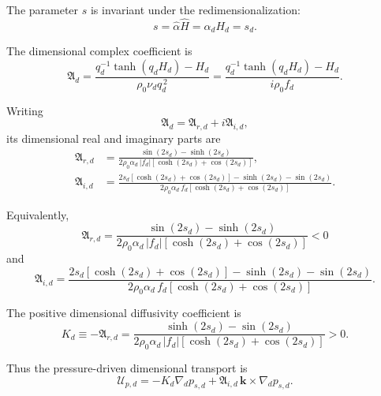 \documentclass[10pt]{amsart}
\begin{document}
The parameter \(s\) is invariant under the redimensionalization:
\begin{equation}
s
=
\widehat\alpha\widehat H
=
\alpha_dH_d
=
s_d.
\end{equation}

The dimensional complex coefficient is
\begin{equation}
\mathfrak A_d
=
\frac{
q_d^{-1}\tanh(q_dH_d)-H_d
}{
\rho_0\nu_d q_d^{\,2}
}
=
\frac{
q_d^{-1}\tanh(q_dH_d)-H_d
}{
i\rho_0 f_d
}.
\end{equation}

Writing
\begin{equation}
\mathfrak A_d
=
\mathfrak A_{r,d}
+i\mathfrak A_{i,d},
\end{equation}
its dimensional real and imaginary parts are
\begin{subequations}
\label{eq:A-real-imag-dimensional}
\begin{align}
\mathfrak A_{r,d}
&=
\frac{
\sin(2s_d)-\sinh(2s_d)
}{
2\rho_0\alpha_d\,|f_d|
\left[\cosh(2s_d)+\cos(2s_d)\right]
},
\label{eq:A-real-dimensional}
\\[1ex]
\mathfrak A_{i,d}
&=
\frac{
2s_d\left[\cosh(2s_d)+\cos(2s_d)\right]
-\sinh(2s_d)-\sin(2s_d)
}{
2\rho_0\alpha_d\,f_d
\left[\cosh(2s_d)+\cos(2s_d)\right]
}.
\label{eq:A-imag-dimensional}
\end{align}
\end{subequations}

Equivalently,
\begin{equation}
\boxed{
\mathfrak A_{r,d}
=
\frac{
\sin(2s_d)-\sinh(2s_d)
}{
2\rho_0\alpha_d\,|f_d|
\left[\cosh(2s_d)+\cos(2s_d)\right]
}
<0
}
\end{equation}
and
\begin{equation}
\boxed{
\mathfrak A_{i,d}
=
\frac{
2s_d\left[\cosh(2s_d)+\cos(2s_d)\right]
-\sinh(2s_d)-\sin(2s_d)
}{
2\rho_0\alpha_d\,f_d
\left[\cosh(2s_d)+\cos(2s_d)\right]
}
}.
\end{equation}

The positive dimensional diffusivity coefficient is
\begin{equation}
K_d
\equiv
-\mathfrak A_{r,d}
=
\frac{
\sinh(2s_d)-\sin(2s_d)
}{
2\rho_0\alpha_d\,|f_d|
\left[\cosh(2s_d)+\cos(2s_d)\right]
}
>0.
\end{equation}

Thus the pressure-driven dimensional transport is
\begin{equation}
\boldsymbol{\mathcal U}_{p,d}
=
-K_d\nabla_d p_{s,d}
+
\mathfrak A_{i,d}\,
\boldsymbol{k}\times\nabla_d p_{s,d}.
\end{equation}
\end{document}
